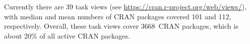 Currently there are 39 task views (see
\url{https://cran.r-project.org/web/views/}), with median and mean
numbers of CRAN packages covered 101 and 112, respectively.  Overall,
these task views cover 3668~CRAN packages, which is about 20\% of all
active CRAN packages.

\address{Kurt Hornik \\
  WU Wirtschaftsuniversit\"at Wien, Austria \\
  }

\address{Uwe Ligges \\
  TU Dortmund, Germany \\
  }

\address{Achim Zeileis \\
  Universit\"at Innsbruck, Austria \\
  }

